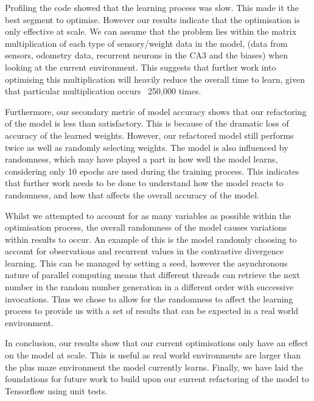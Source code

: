 {
Profiling the code showed that the learning process was slow.
This made it the best segment to optimise.
However our results indicate that the optimisation is only effective at scale.
We can assume that the problem lies within the matrix multiplication of each type of sensory/weight data in the model, (data from sensors, odometry data, recurrent neurons in the CA3 and the biases) when looking at the current environment.
This suggests that further work into optimising this multiplication will heavily reduce the overall time to learn, given that particular multiplication occurs ~250,000 times.

Furthermore, our secondary metric of model accuracy shows that our refactoring of the model is less than satisfactory.
This is because of the dramatic loss of accuracy of the learned weights.
However, our refactored model still performs twice as well as randomly selecting weights.
The model is also influenced by randomness, which may have played a part in how well the model learns, considering only 10 epochs are used during the training process.
This indicates that further work needs to be done to understand how the model reacts to randomness, and how that affects the overall accuracy of the model.

}

{

Whilst we attempted to account for as many variables as possible within the optimisation process, the overall randomness of the model causes variations within results to occur.
An example of this is the model randomly choosing to account for observations and recurrent values in the  contrastive divergence learning.
This can be managed by setting a seed, however the asynchronous nature of parallel computing means that different threads can retrieve the next number in the random number generation in a different order with successive invocations.
Thus we chose to allow for the randomness to affect the learning process to provide us with a set of results that can be expected in a real world environment. 
}


{
In conclusion, our results show that our current optimisations only have an effect on the model at scale.
This is useful as real world environments are larger than the plus maze environment the model currently learns.
Finally, we have laid the foundations for future work to build upon our current refactoring of the model to Tensorflow using unit tests.

}

